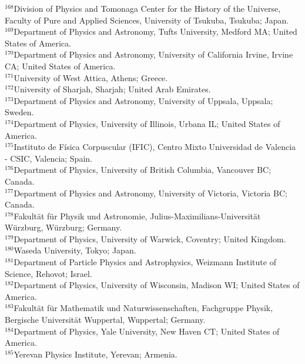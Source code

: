 \begin{flushleft}
$^{168}$Division of Physics and Tomonaga Center for the History of the Universe, Faculty of Pure and Applied Sciences, University of Tsukuba, Tsukuba; Japan.\\
$^{169}$Department of Physics and Astronomy, Tufts University, Medford MA; United States of America.\\
$^{170}$Department of Physics and Astronomy, University of California Irvine, Irvine CA; United States of America.\\
$^{171}$University of West Attica, Athens; Greece.\\
$^{172}$University of Sharjah, Sharjah; United Arab Emirates.\\
$^{173}$Department of Physics and Astronomy, University of Uppsala, Uppsala; Sweden.\\
$^{174}$Department of Physics, University of Illinois, Urbana IL; United States of America.\\
$^{175}$Instituto de F\'isica Corpuscular (IFIC), Centro Mixto Universidad de Valencia - CSIC, Valencia; Spain.\\
$^{176}$Department of Physics, University of British Columbia, Vancouver BC; Canada.\\
$^{177}$Department of Physics and Astronomy, University of Victoria, Victoria BC; Canada.\\
$^{178}$Fakult\"at f\"ur Physik und Astronomie, Julius-Maximilians-Universit\"at W\"urzburg, W\"urzburg; Germany.\\
$^{179}$Department of Physics, University of Warwick, Coventry; United Kingdom.\\
$^{180}$Waseda University, Tokyo; Japan.\\
$^{181}$Department of Particle Physics and Astrophysics, Weizmann Institute of Science, Rehovot; Israel.\\
$^{182}$Department of Physics, University of Wisconsin, Madison WI; United States of America.\\
$^{183}$Fakult{\"a}t f{\"u}r Mathematik und Naturwissenschaften, Fachgruppe Physik, Bergische Universit\"{a}t Wuppertal, Wuppertal; Germany.\\
$^{184}$Department of Physics, Yale University, New Haven CT; United States of America.\\
$^{185}$Yerevan Physics Institute, Yerevan; Armenia.\\


\end{flushleft}
